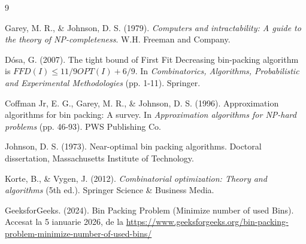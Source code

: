 \documentclass[runningheads]{llncs}
\begin{document}

\begin{thebibliography}{9}

Garey, M. R., \& Johnson, D. S. (1979). \textit{Computers and intractability: A guide to the theory of NP-completeness}. W.H. Freeman and Company.

Dósa, G. (2007). The tight bound of First Fit Decreasing bin-packing algorithm is $FFD(I) \leq 11/9 OPT(I) + 6/9$. In \textit{Combinatorics, Algorithms, Probabilistic and Experimental Methodologies} (pp. 1-11). Springer.

Coffman Jr, E. G., Garey, M. R., \& Johnson, D. S. (1996). Approximation algorithms for bin packing: A survey. In \textit{Approximation algorithms for NP-hard problems} (pp. 46-93). PWS Publishing Co.

Johnson, D. S. (1973). Near-optimal bin packing algorithms. Doctoral dissertation, Massachusetts Institute of Technology.

Korte, B., \& Vygen, J. (2012). \textit{Combinatorial optimization: Theory and algorithms} (5th ed.). Springer Science \& Business Media.

GeeksforGeeks. (2024). Bin Packing Problem (Minimize number of used Bins). Accesat la 5 ianuarie 2026, de la \url{https://www.geeksforgeeks.org/bin-packing-problem-minimize-number-of-used-bins/}

\end{thebibliography}
\end{document}
